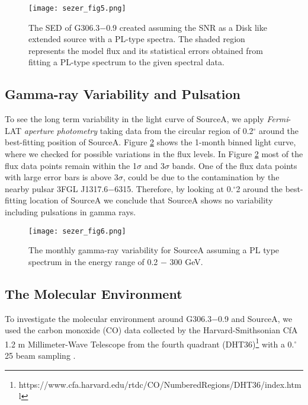 \documentclass[useAMS,usenatbib]{mn2e}
\begin{document}
\begin{figure}
\centering \vspace*{1pt}
\texttt{[image: sezer\_fig5.png]}
\caption{The SED of G306.3$-$0.9 created assuming the SNR as a Disk like extended source with a PL-type spectra. The shaded region represents the model flux and its statistical errors obtained from fitting a PL-type spectrum to the given spectral data.}
\label{gfigure_3}
\end{figure}

\subsection {Gamma-ray Variability and Pulsation}
To see the long term variability in the light curve of SourceA, we apply {\it Fermi}-LAT {\it aperture photometry} taking data from the circular region of 0.2$^{\circ}$ around the best-fitting position of SourceA. Figure \ref{gfigure_4} shows the 1-month binned light curve, where we checked for possible variations in the flux levels. In Figure \ref{gfigure_4} most of the flux data points remain within the 1$\sigma$ and 3$\sigma$ bands. One of the flux data points with large error bars is above 3$\sigma$, could be due to the contamination by the nearby pulsar 3FGL J1317.6$-$6315. Therefore, by looking at 0.$\!\!^{\circ}$2 around the best-fitting location of SourceA we conclude that SourceA shows no variability including pulsations in gamma rays.

\begin{figure}
\centering \vspace*{1pt}
\texttt{[image: sezer\_fig6.png]}
\caption{The monthly gamma-ray variability for SourceA assuming a PL type spectrum in the energy range of 0.2 $-$ 300 GeV.}
\label{gfigure_4}
\end{figure}

\subsection {The Molecular Environment}
To investigate the molecular environment around G306.3$-$0.9 and SourceA, we used the carbon monoxide (CO) data collected by the Harvard-Smithsonian CfA 1.2 m Millimeter-Wave Telescope from the fourth quadrant (DHT36)\footnote{https://www.cfa.harvard.edu/rtdc/CO/NumberedRegions/DHT36/index.html} with a 0.$\!\!^{\circ}$25 beam sampling \citep{Br89}.
\end{document}

